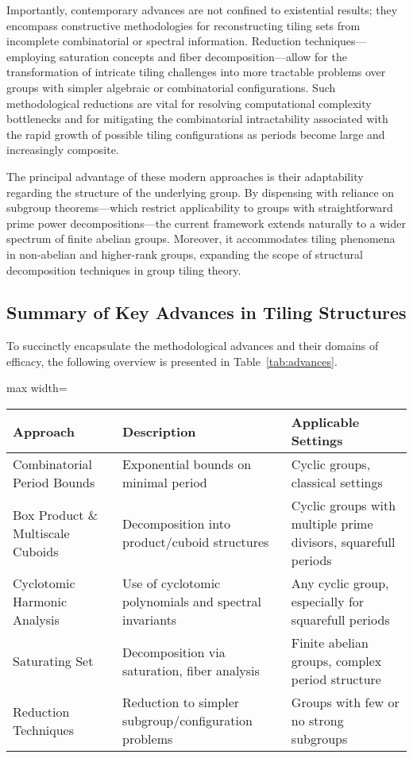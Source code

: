 \documentclass[sigconf]{acmart}
\begin{document}
Importantly, contemporary advances are not confined to existential results; they encompass constructive methodologies for reconstructing tiling sets from incomplete combinatorial or spectral information. Reduction techniques---employing saturation concepts and fiber decomposition---allow for the transformation of intricate tiling challenges into more tractable problems over groups with simpler algebraic or combinatorial configurations. Such methodological reductions are vital for resolving computational complexity bottlenecks and for mitigating the combinatorial intractability associated with the rapid growth of possible tiling configurations as periods become large and increasingly composite.

The principal advantage of these modern approaches is their adaptability regarding the structure of the underlying group. By dispensing with reliance on subgroup theorems---which restrict applicability to groups with straightforward prime power decompositions---the current framework extends naturally to a wider spectrum of finite abelian groups. Moreover, it accommodates tiling phenomena in non-abelian and higher-rank groups, expanding the scope of structural decomposition techniques in group tiling theory.

\subsection{Summary of Key Advances in Tiling Structures}

To succinctly encapsulate the methodological advances and their domains of efficacy, the following overview is presented in Table~\ref{tab:advances}.

\begin{table*}[htbp]
\centering
\caption{Major Approaches in Tiling Theory and Their Domains of Applicability}
\label{tab:advances}
\begin{adjustbox}{max width=\textwidth}
\begin{tabular}{lll}
\toprule
\textbf{Approach} & \textbf{Description} & \textbf{Applicable Settings} \\
\midrule
Combinatorial Period Bounds & Exponential bounds on minimal period & Cyclic groups, classical settings \\
Box Product \& Multiscale Cuboids & Decomposition into product/cuboid structures & Cyclic groups with multiple prime divisors, squarefull periods \\
Cyclotomic Harmonic Analysis & Use of cyclotomic polynomials and spectral invariants & Any cyclic group, especially for squarefull periods \\
Saturating Set & Decomposition via saturation, fiber analysis & Finite abelian groups, complex period structure \\
Reduction Techniques & Reduction to simpler subgroup/configuration problems & Groups with few or no strong subgroups \\
\bottomrule
\end{tabular}
\end{adjustbox}
\end{table*}
\end{document}

